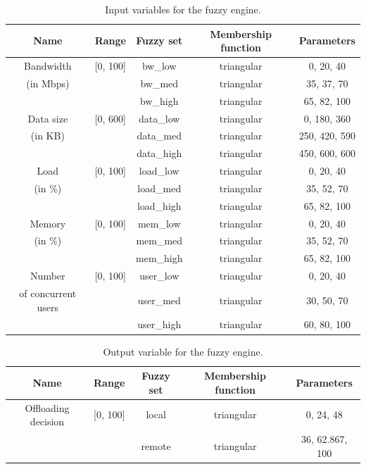 \begin{table}[H]
  \centering
  \begin{tabular}{|c|c|c|c|c|}
    \hline
    Name                & Range    & Fuzzy set & Membership function & Parameters    \\
    \hline
    Bandwidth           & [0, 100] & bw_low    & triangular          & 0, 20, 40     \\
    (in Mbps)           &          & bw_med    & triangular          & 35, 37, 70    \\
                        &          & bw_high   & triangular          & 65, 82, 100   \\
    \hline
    Data size           & [0, 600] & data_low  & triangular          & 0, 180, 360   \\
    (in KB)             &          & data_med  & triangular          & 250, 420, 590 \\
                        &          & data_high & triangular          & 450, 600, 600 \\
    \hline
    Load                & [0, 100] & load_low  & triangular          & 0, 20, 40     \\
    (in \%)             &          & load_med  & triangular          & 35, 52, 70    \\
                        &          & load_high & triangular          & 65, 82, 100   \\
    \hline
    Memory              & [0, 100] & mem_low   & triangular          & 0, 20, 40     \\
    (in \%)             &          & mem_med   & triangular          & 35, 52, 70    \\
                        &          & mem_high  & triangular          & 65, 82, 100   \\
    \hline
    Number              & [0, 100] & user_low  & triangular          & 0, 20, 40     \\
    of concurrent users &          & user_med  & triangular          & 30, 50, 70    \\
                        &          & user_high & triangular          & 60, 80, 100   \\
    \hline
  \end{tabular}
  \caption{Input variables for the fuzzy engine.}
  \label{tab:new-fuzzy-input}
\end{table}

\begin{table}[H]
  \centering
  \begin{tabular}{|c|c|c|c|c|}
    \hline
    Name                & Range    & Fuzzy set & Membership function & Parameters      \\
    \hline
    Offloading decision & [0, 100] & local     & triangular          & 0, 24, 48       \\
                        &          & remote    & triangular          & 36, 62.867, 100 \\
    \hline
  \end{tabular}
  \caption{Output variable for the fuzzy engine.}
  \label{tab:new-fuzzy-output}
\end{table}

